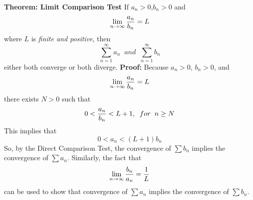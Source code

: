 \nopagenumbers
{\bf Theorem: Limit Comparison Test}
\vskip 6pt
If $a_n>0$,$b_n>0$ and $$\lim_{n\to\infty}{a_n \over b_n}=L$$ where $L$ is {\it finite and positive}, then $$\sum_{n=1}^\infty a_n \;\; and \;\; \sum_{n=1}^\infty b_n$$ either both converge or both diverge.
\vskip 10pt
{\bf Proof:}
\vskip 6pt
Because $a_n>0$, $b_n>0$, and $$\lim_{n\to\infty}{a_n \over b_n}=L$$ there exists $N>0$ such that $$0<{a_n \over b_n}<L+1, \;\; for \;\; n\geq N$$ This implies that $$0<a_n<(L+1)b_n$$ So, by the Direct Comparison Test, the convergence of $\sum b_n$ implies the convergence of $\sum a_n$. Similarly, the fact that $$\lim_{n\to\infty}{b_n \over a_n}={1\over L}$$ can be used to show that convergence of $\sum a_n$ implies the convergence of $\sum b_n$.


\vfill\eject
